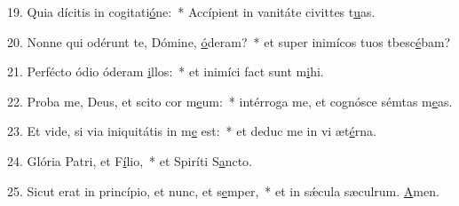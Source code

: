 19. Quia dícitis in cogitati\uline{ó}ne:~* Accípient in vanitáte civittes t\uline{u}as.\par 
20. Nonne qui odérunt te, Dómine, \uline{ó}deram?~* et super inimícos tuos tbesc\uline{é}bam?\par 
21. Perfécto ódio óderam \uline{i}llos:~* et inimíci fact sunt m\uline{i}hi.\par 
22. Proba me, Deus, et scito cor m\uline{e}um:~* intérroga me, et cognósce sémtas m\uline{e}as.\par 
23. Et vide, si via iniquitátis in m\uline{e} est:~* et deduc me in vi æt\uline{é}rna.\par 
24. Glória Patri, et F\uline{í}lio,~* et Spiríti S\uline{a}ncto.\par 
25. Sicut erat in princípio, et nunc, et s\uline{e}mper,~* et in sǽcula sæculrum. \uline{A}men.\par 
